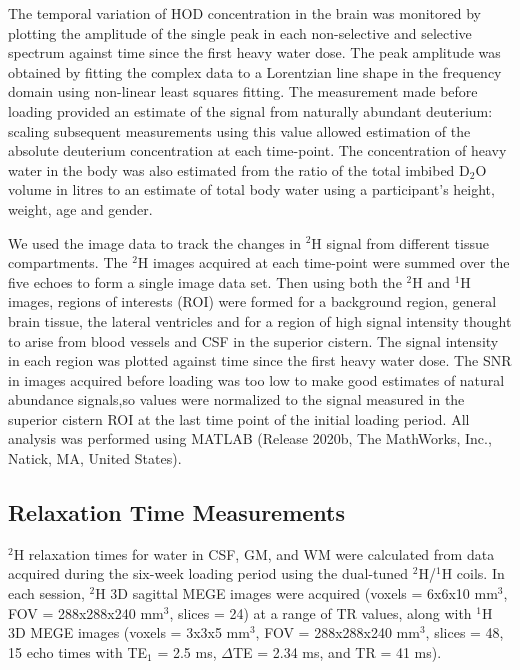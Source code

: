 \documentclass[class=article, crop=false]{standalone}
\begin{document}
The temporal variation of HOD concentration in the brain was monitored by plotting the amplitude of the single peak in each non-selective and selective spectrum against time since the first heavy water dose. The peak amplitude was obtained by fitting the complex data to a Lorentzian line shape in the frequency domain using non-linear least squares fitting. The measurement made before loading provided an estimate of the signal from naturally abundant deuterium: scaling subsequent measurements using this value allowed estimation of the absolute deuterium concentration at each time-point. The concentration of heavy water in the body was also estimated from the ratio of the total imbibed D$_2$O volume in litres to an estimate of total body water using a participant’s height, weight, age and gender\cite{Watson1980TotalMeasurements}.

We used the image data to track the changes in $^2$H signal from different tissue compartments. The $^2$H images acquired at each time-point were summed over the five echoes to form a single image data set. Then using both the $^2$H and $^1$H images, regions of interests (ROI) were formed for a background region, general brain tissue, the lateral ventricles and for a region of high signal intensity thought to arise from blood vessels and CSF in the superior cistern. The signal intensity in each region was plotted against time since the first heavy water dose. The SNR in images acquired before loading was too low to make good estimates of natural abundance signals,so values were normalized to the signal measured in the superior cistern ROI at the last time point of the initial loading period. All analysis was performed using MATLAB (Release 2020b, The MathWorks, Inc., Natick, MA, United States).

\subsection{Relaxation Time Measurements}
\label{Chap:D2O:Relaxation}

$^2$H relaxation times for water in CSF, GM, and WM were calculated from data acquired during the six-week loading period using the dual-tuned $^2$H/$^1$H coils. In each session, $^2$H 3D sagittal MEGE images were acquired (voxels = 6x6x10 mm$^3$, FOV = 288x288x240 mm$^3$, slices = 24) at a range of TR values, along with $^1$H 3D MEGE images (voxels = 3x3x5 mm$^3$, FOV = 288x288x240 mm$^3$, slices = 48, 15 echo times with TE$_1$ = 2.5 ms, $\Delta$TE = 2.34 ms, and TR = 41 ms). 
\end{document}

